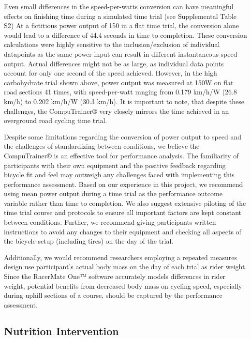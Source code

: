 \documentclass[]{cik}%
\begin{document}
\newpage

Even small differences in the speed-per-watts conversion can have
meaningful effects on finishing time during a simulated time trial (see
Supplemental Table S2) At a fictitious power output of 150 in a flat
time trial, the conversion alone would lead to a difference of 44.4
seconds in time to completion. These conversion calculations were highly
sensitive to the inclusion/exclusion of individual datapoints as the
same power input can result in different instantaneous speed output.
Actual differences might not be as large, as individual data points
account for only one second of the speed achieved. However, in the high
carbohydrate trial shown above, power output was measured at 150W on
flat road sections 41 times, with speed-per-watt ranging from 0.179
km/h/W (26.8 km/h) to 0.202 km/h/W (30.3 km/h). It is important to note,
that despite these challenges, the CompuTrainer® very closely mirrors
the time achieved in an overground road cycling time trial.

Despite some limitations regarding the conversion of power output to
speed and the challenges of standardizing between conditions, we believe
the CompuTrainer® is an effective tool for performance analysis. The
familiarity of participants with their own equipment and the positive
feedback regarding bicycle fit and feel may outweigh any challenges
faced with implementing this performance assessment. Based on our
experience in this project, we recommend using mean power output during
a time trial as the performance outcome variable rather than time to
completion. We also suggest extensive piloting of the time trial course
and protocols to ensure all important factors are kept constant between
conditions. Further, we recommend giving participants written
instructions to avoid any changes to their equipment and checking all
aspects of the bicycle setup (including tires) on the day of the trial.

Additionally, we would recommend researchers employing a repeated
measures design use participant's actual body mass on the day of each
trial as rider weight. Since the RacerMate One™ software accurately
models differences in rider weight, potential benefits from decreased
body mass on cycling speed, especially during uphill sections of a
course, should be captured by the performance assessment.

\hypertarget{nutrition-intervention}{%
\subsection{Nutrition Intervention}\label{nutrition-intervention}}
\end{document}
